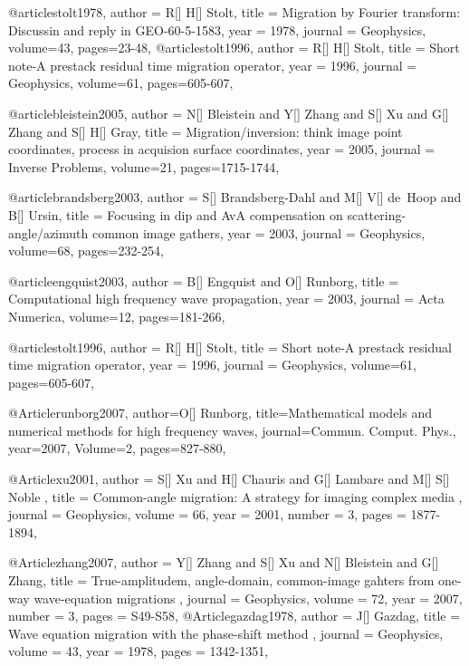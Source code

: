 {@article{stolt1978,
  author =	 {R[] H[] Stolt},
  title =	 {Migration by Fourier transform: Discussin and reply in GEO-60-5-1583},
  year =	 1978,
  journal =	 {Geophysics},
  volume={43},
 pages=23-48,
}
@article{stolt1996,
  author =	 {R[] H[] Stolt},
  title =	 {Short note-A prestack residual time migration operator},
  year =	 1996,
  journal =	 {Geophysics},
  volume={61},
 pages=605-607,
}

@article{bleistein2005,
  author =	 {N[] Bleistein and Y[] Zhang and S[] Xu and G[] Zhang and S[] H[] Gray},
  title =	 {Migration/inversion: think image point coordinates, process in acquision surface coordinates},
  year =	 2005,
  journal =	 {Inverse Problems},
  volume={21},
 pages=1715-1744,
}

@article{brandsberg2003,
  author =	 {S[] Brandsberg-Dahl and M[] V[] de~Hoop and B[] Ursin},
  title =	 {Focusing in dip and AvA compensation on scattering-angle/azimuth common image gathers},
  year =	 2003,
  journal =	 {Geophysics},
  volume={68},
 pages=232-254,
}

@article{engquist2003,
  author =	 {B[] Engquist and O[] Runborg},
  title =	 {Computational high frequency wave propagation},
  year =	 2003,
  journal =	 {Acta Numerica},
  volume={12},
 pages=181-266,
}

@article{stolt1996,
  author =	 {R[] H[] Stolt},
  title =	 {Short note-A prestack residual time migration operator},
  year =	 1996,
  journal =	 {Geophysics},
  volume={61},
 pages=605-607,
}

@Article{runborg2007,
  author={O[] Runborg},
  title={Mathematical models and numerical methods for high frequency waves},
  journal={Commun. Comput. Phys.},
  year=2007,
  Volume=2,
  pages={827-880},
}

@Article{xu2001,
  author =	 { S[] Xu and H[] Chauris and G[] Lambare and M[] S[] Noble },
  title =	 { Common-angle migration: A strategy for imaging complex media },
  journal =	 {Geophysics},
  volume =	 66,
  year =	 2001,
  number =	 3,
  pages =	 {1877-1894},
}

@Article{zhang2007,
  author =	 { Y[] Zhang and S[] Xu and N[] Bleistein and G[] Zhang},
  title =	 { True-amplitudem, angle-domain, common-image gahters from one-way wave-equation migrations },
  journal =	 {Geophysics},
  volume =	 72,
  year =	 2007,
  number =	 3,
  pages =	 {S49-S58},
}
@Article{gazdag1978,
  author =	 { J[] Gazdag},
  title =	 { Wave equation migration with the phase-shift method },
  journal =	 {Geophysics},
  volume =	 43,
  year =	 1978,
  pages =	 {1342-1351},
}

}
